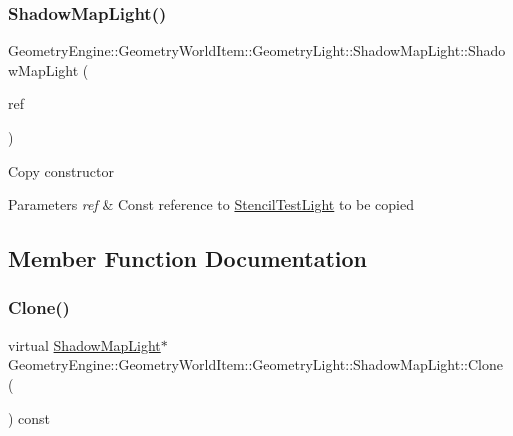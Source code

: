 \subsubsection{\texorpdfstring{ShadowMapLight()}{ShadowMapLight()}\hspace{0.1cm}{\footnotesize\ttfamily [2/2]}}
{\footnotesize\ttfamily Geometry\+Engine\+::\+Geometry\+World\+Item\+::\+Geometry\+Light\+::\+Shadow\+Map\+Light\+::\+Shadow\+Map\+Light (\begin{DoxyParamCaption}\item[{const \mbox{\hyperlink{class_geometry_engine_1_1_geometry_world_item_1_1_geometry_light_1_1_shadow_map_light}{Shadow\+Map\+Light}} \&}]{ref }\end{DoxyParamCaption})\hspace{0.3cm}{\ttfamily [inline]}}

Copy constructor 
\begin{DoxyParams}{Parameters}
{\em ref} & Const reference to \mbox{\hyperlink{class_geometry_engine_1_1_geometry_world_item_1_1_geometry_light_1_1_stencil_test_light}{Stencil\+Test\+Light}} to be copied \\
\hline
\end{DoxyParams}


\subsection{Member Function Documentation}
\mbox{\label{class_geometry_engine_1_1_geometry_world_item_1_1_geometry_light_1_1_shadow_map_light_a48eb6af2e6bb8487568ee4265fbc49ee}} 
\subsubsection{\texorpdfstring{Clone()}{Clone()}}
{\footnotesize\ttfamily virtual \mbox{\hyperlink{class_geometry_engine_1_1_geometry_world_item_1_1_geometry_light_1_1_shadow_map_light}{Shadow\+Map\+Light}}$\ast$ Geometry\+Engine\+::\+Geometry\+World\+Item\+::\+Geometry\+Light\+::\+Shadow\+Map\+Light\+::\+Clone (\begin{DoxyParamCaption}{ }\end{DoxyParamCaption}) const\hspace{0.3cm}{\ttfamily [pure virtual]}}

